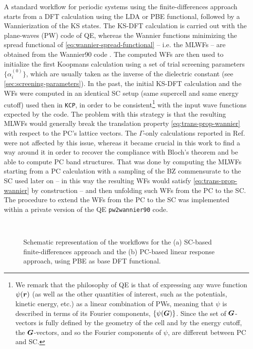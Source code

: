 A standard workflow for periodic systems using the finite-differences approach starts from a DFT calculation using the LDA or PBE functional, followed by a Wannierization of the KS states. The KS-DFT calculation is carried out with the plane-waves (PW) code of QE, whereas the Wannier functions minimizing the spread functional of \cref{eq:wannier-spread-functional} -- i.e. the MLWFs -- are obtained from the Wannier90 code \cite{pizzi_wannier90_2020}. The computed WFs are then used to initialize the first Koopmans calculation using a set of trial screening parameters $\{ \alpha_i^{(0)} \}$, which are usually taken as the inverse of the dielectric constant (see \cref{sec:screening-parameters}). In the past, the initial KS-DFT calculation and the WFs were computed in an identical SC setup (same supercell and same energy cutoff) used then in \texttt{KCP}, in order to be consistent\footnote{
We remark that the philosophy of QE is that of expressing any wave function $\psi({\bm r})$ (as well as the other quantities of interest, such as the potentials, kinetic energy, etc.) as a linear combination of PWs, meaning that $\psi$ is described in terms of its Fourier components, $\{ \psi({\bm G}) \}$. Since the set of ${\bm G}$-vectors is fully defined by the geometry of the cell and by the energy cutoff, the ${\bm G}$-vectors, and so the Fourier components of $\psi$, are different between PC and SC.
}
with the input wave functions expected by the \kcp code. The problem with this strategy is that the resulting MLWFs would generally break the translation property \eqref{eq:trans-prop-wannier} with respect to the PC's lattice vectors. The $\Gamma$-only calculations reported in Ref.~\cite{nguyen_koopmans-compliant_2018} were not affected by this issue, whereas it became crucial in this work to find a way around it in order to recover the compliance with Bloch's theorem and be able to compute PC band structures. That was done by computing the MLWFs starting from a PC calculation with a sampling of the BZ commensurate to the SC used later on -- in this way the resulting WFs would satisfy \cref{eq:trans-prop-wannier} by construction -- and then unfolding such WFs from the PC to the SC. The procedure to extend the WFs from the PC to the SC was implemented within a private version of the QE \texttt{pw2wannier90} code.

\begin{figure}
    \centering
     \\
    \caption[]{Schematic representation of the workflows for the (a) SC-based finite-differences approach and the (b) PC-based linear response approach, using PBE as base DFT functional.}
    \label{fig:workflow}
\end{figure}

